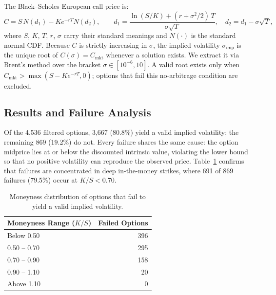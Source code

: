 \documentclass[12pt, a4paper]{article}
\begin{document}
The Black--Scholes European call price is:
\begin{equation}
    C = S\,N(d_1) - K e^{-rT} N(d_2), \qquad
    d_1 = \frac{\ln(S/K) + (r + \sigma^2/2)\,T}{\sigma\sqrt{T}}, \quad
    d_2 = d_1 - \sigma\sqrt{T},
    \label{eq:bs}
\end{equation}
where $S$, $K$, $T$, $r$, $\sigma$ carry their standard meanings and $N(\cdot)$ is the
standard normal CDF. Because $C$ is strictly increasing in $\sigma$, the implied
volatility $\sigma_{\text{imp}}$ is the unique root of $C(\sigma) = C_{\text{mkt}}$
whenever a solution exists. We extract it via Brent's method \citep{Brent1973} over the
bracket $\sigma \in [10^{-6}, 10]$. A valid root exists only when $C_{\text{mkt}} >
\max(S - Ke^{-rT}, 0)$; options that fail this no-arbitrage condition are excluded.

\subsection{Results and Failure Analysis}

Of the 4,536 filtered options, 3,667 (80.8\%) yield a valid implied volatility; the
remaining 869 (19.2\%) do not. Every failure shares the same cause: the option midprice
lies at or below the discounted intrinsic value, violating the lower bound so that no
positive volatility can reproduce the observed price. Table~\ref{tab:failures} confirms
that failures are concentrated in deep in-the-money strikes, where 691 of 869 failures
(79.5\%) occur at $K/S < 0.70$.

\begin{table}[H]
\centering
\caption{Moneyness distribution of options that fail to yield a valid implied volatility.}
\label{tab:failures}
\begin{tabular}{lr}
\toprule
Moneyness Range ($K/S$) & Failed Options \\
\midrule
Below 0.50       & 396 \\
0.50 -- 0.70     & 295 \\
0.70 -- 0.90     & 158 \\
0.90 -- 1.10     &  20 \\
Above 1.10       &   0 \\
\bottomrule
\end{tabular}
\end{table}
\end{document}
